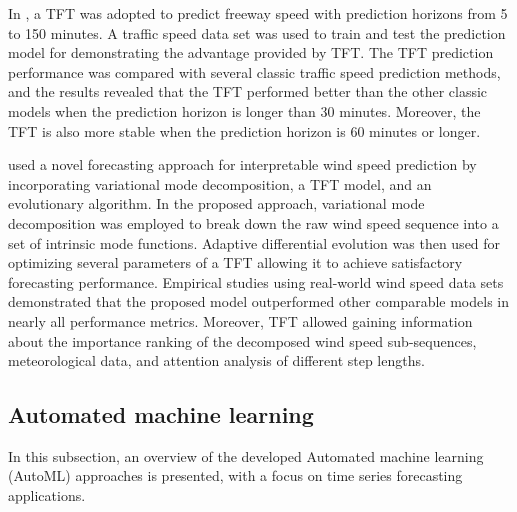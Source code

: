 In \cite{ZHANG2022329}, a TFT was adopted to predict freeway speed with prediction horizons from 5 to 150 minutes.
A traffic speed data set was used to train and test the prediction model for demonstrating the advantage provided by TFT.
The TFT prediction performance was compared with several classic traffic speed prediction methods, and the results revealed that the TFT performed better than the other classic models when the prediction horizon is longer than 30 minutes.
Moreover, the TFT is also more stable when the prediction horizon is 60 minutes or longer.

\cite{WU2022123990} used a novel forecasting approach for interpretable wind speed prediction by incorporating variational mode decomposition, a TFT model, and an evolutionary algorithm.
In the proposed approach, variational mode decomposition was employed to break down the raw wind speed sequence into a set of intrinsic mode functions.
Adaptive differential evolution was then used for optimizing several parameters of a TFT allowing it to achieve satisfactory forecasting performance.
Empirical studies using real-world wind speed data sets demonstrated that the proposed model outperformed other comparable models in nearly all performance metrics.
Moreover, TFT allowed gaining information about the importance ranking of the decomposed wind speed sub-sequences, meteorological data, and attention analysis of different step lengths.


\vspace{0.1 cm}
\subsection{Automated machine learning}
\label{sec:automl}
\vspace{0.1 cm}

In this subsection, an overview of the developed Automated machine learning (AutoML) approaches is presented, with a focus on time series forecasting applications.

\cite{Elshawi2019}

\cite{8995391}

\cite{9033810}

\cite{computers10010011}

\cite{HE2021106622}

\cite{9579526}

\cite{Karmaker2021}

\cite{Chen2021}


\cite{Feurer2015}

